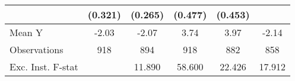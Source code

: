 {\begin{tabular}{l*{5}{c}}
            &     (0.321)         &     (0.265)         &     (0.477)         &     (0.453)         &                     \\
\midrule
Mean Y      &       -2.03         &       -2.07         &        3.74         &        3.97         &       -2.14         \\
Observations&         918         &         894         &         918         &         882         &         858         \\
Exc. Inst. F-stat&                     &      11.890         &      58.600         &      22.426         &      17.912         \\
\bottomrule
\end{tabular}
}
